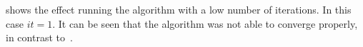 \pagebreak
{} shows the effect running the algorithm with a low number of iterations. In this case $it=1$. It can be seen that the algorithm was not able to converge properly, in contrast to~.


